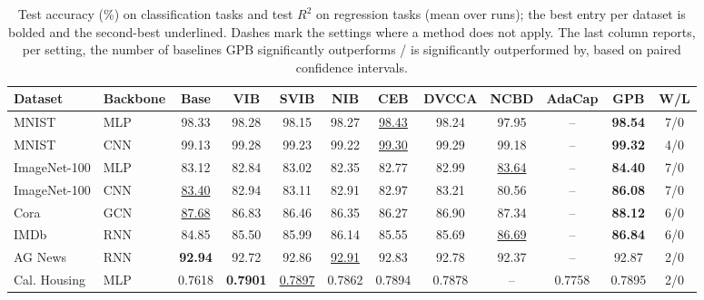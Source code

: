 \begin{table}[t]
\centering
\caption{Test accuracy (\%) on classification tasks and test $R^2$ on regression tasks (mean over runs); the best entry per dataset is bolded and the second-best underlined. Dashes mark the settings where a method does not apply. The last column reports, per setting, the number of baselines GPB significantly outperforms / is significantly outperformed by, based on paired confidence intervals.}
\label{tab:main_result}
\small
{
\setlength{\tabcolsep}{2pt}
\begin{tabular}{llcccccccc|cc}
\hline
Dataset & Backbone & Base & VIB & SVIB & NIB & CEB & DVCCA & NCBD & AdaCap & GPB & W/L \\
\hline
MNIST & MLP & 98.33 & 98.28 & 98.15 & 98.27 & \underline{98.43} & 98.24 & 97.95 & -- & \textbf{98.54} & 7/0 \\
MNIST & CNN & 99.13 & 99.28 & 99.23 & 99.22 & \underline{99.30} & 99.29 & 99.18 & -- & \textbf{99.32} & 4/0 \\
ImageNet-100 & MLP & 83.12 & 82.84 & 83.02 & 82.35 & 82.77 & 82.99 & \underline{83.64} & -- & \textbf{84.40} & 7/0 \\
ImageNet-100 & CNN & \underline{83.40} & 82.94 & 83.11 & 82.91 & 82.97 & 83.21 & 80.56 & -- & \textbf{86.08} & 7/0 \\
Cora & GCN & \underline{87.68} & 86.83 & 86.46 & 86.35 & 86.27 & 86.90 & 87.34 & -- & \textbf{88.12} & 6/0 \\
IMDb & RNN & 84.85 & 85.50 & 85.99 & 86.14 & 85.55 & 85.69 & \underline{86.69} & -- & \textbf{86.84} & 6/0 \\
AG News & RNN & \textbf{92.94} & 92.72 & 92.86 & \underline{92.91} & 92.83 & 92.78 & 92.37 & -- & 92.87 & 2/0 \\
\hline\hline
Cal. Housing & MLP & 0.7618 & \textbf{0.7901} & \underline{0.7897} & 0.7862 & 0.7894 & 0.7878 & -- & 0.7758 & 0.7895 & 2/0 \\

\end{tabular}}
\end{table}
